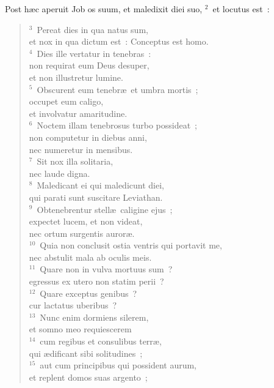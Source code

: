 \lettrine[lines=10,image=true,loversize=0.05,lraise=-0.03]{P}{}ost h\ae c aperuit Job os suum, et maledixit diei suo,
${}^{2}$~et locutus est~:
\begin{flushleft}\begin{verse}${}^{3}$~Pereat dies in qua natus sum,\\ et nox in qua dictum est~: Conceptus est homo.\\
${}^{4}$~Dies ille vertatur in tenebras~:\\ non requirat eum Deus desuper,\\ et non illustretur lumine.\\
${}^{5}$~Obscurent eum tenebr\ae\ et umbra mortis~;\\ occupet eum caligo,\\ et involvatur amaritudine.\\
${}^{6}$~Noctem illam tenebrosus turbo possideat~;\\ non computetur in diebus anni,\\ nec numeretur in mensibus.\\
${}^{7}$~Sit nox illa solitaria,\\ nec laude digna.\\
${}^{8}$~Maledicant ei qui maledicunt diei,\\ qui parati sunt suscitare Leviathan.\\
${}^{9}$~Obtenebrentur stell\ae\ caligine ejus~;\\ expectet lucem, et non videat,\\ nec ortum surgentis auror\ae .\\
${}^{10}$~Quia non conclusit ostia ventris qui portavit me,\\ nec abstulit mala ab oculis meis.\\
${}^{11}$~Quare non in vulva mortuus sum~?\\ egressus ex utero non statim perii~?\\
${}^{12}$~Quare exceptus genibus~?\\ cur lactatus uberibus~?\\
${}^{13}$~Nunc enim dormiens silerem,\\ et somno meo requiescerem\\
${}^{14}$~cum regibus et consulibus terr\ae ,\\ qui \ae dificant sibi solitudines~;\\
${}^{15}$~aut cum principibus qui possident aurum,\\ et replent domos suas argento~;\\

\end{verse}
\end{flushleft}
